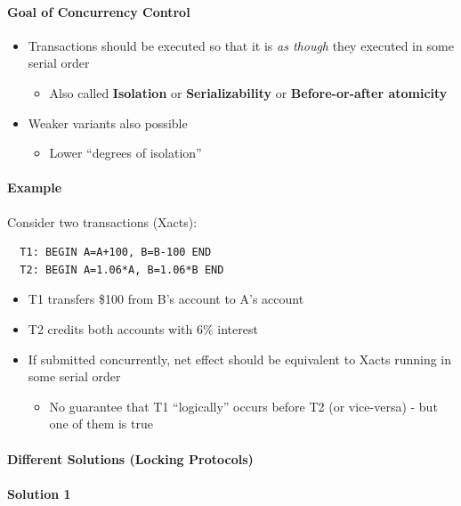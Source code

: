 \paragraph{Goal of Concurrency Control}
\begin{itemize}
\item Transactions should be executed so that it is
  \textit{as though} they executed in some serial order
  \begin{itemize}
  \item Also called \textbf{Isolation} or \textbf{Serializability}
    or \textbf{Before-or-after atomicity}
  \end{itemize}

\item Weaker variants also possible
  \begin{itemize}
  \item Lower ``degrees of isolation''
  \end{itemize}
\end{itemize}

\paragraph{Example}
Consider two transactions (Xacts):

\begin{lstlisting}
  T1: BEGIN A=A+100, B=B-100 END
  T2: BEGIN A=1.06*A, B=1.06*B END
\end{lstlisting}

\begin{itemize}
\item T1 transfers \$100 from B's account to A's account
\item T2 credits both accounts with 6\% interest
\item If submitted concurrently, net effect should be equivalent
  to Xacts running in some serial order
  \begin{itemize}
  \item No guarantee that T1 ``logically'' occurs before T2
    (or vice-versa) - but one of them is true
  \end{itemize}
\end{itemize}

\paragraph{Different Solutions (Locking Protocols)}

\paragraph{Solution 1}

